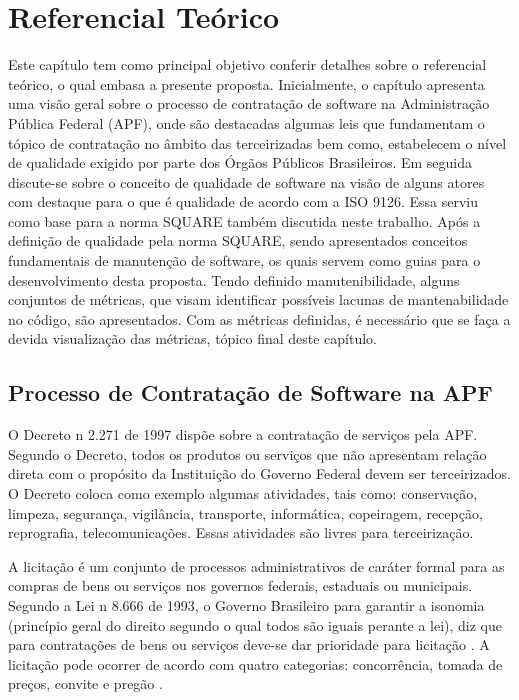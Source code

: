
\chapter[Referencial Teórico]{Referencial Teórico}	
Este capítulo tem como principal objetivo conferir detalhes sobre o referencial teórico, o qual embasa a presente proposta.    Inicialmente, o capítulo apresenta uma visão geral sobre o processo de contratação de software na Administração Pública Federal (APF), onde são destacadas algumas leis que fundamentam o tópico de contratação no âmbito das terceirizadas bem como, estabelecem o nível de qualidade exigido por parte dos Órgãos Públicos Brasileiros. Em seguida discute-se sobre o conceito de qualidade de software na visão de alguns atores com destaque para o que é qualidade de acordo com a ISO 9126. Essa serviu como base para a norma SQUARE também discutida neste trabalho. Após a definição de qualidade pela norma SQUARE, sendo apresentados conceitos fundamentais de manutenção de software, os quais servem como guias para o desenvolvimento desta proposta. Tendo definido manutenibilidade, alguns conjuntos de métricas, que visam identificar possíveis lacunas de mantenabilidade no código, são apresentados. Com as métricas definidas, é necessário que se faça a devida visualização das métricas, tópico final deste capítulo.
	
\section{Processo de Contratação de Software na APF}
O Decreto n 2.271 de 1997 \cite{decreto_2271} dispõe sobre a contratação de serviços pela APF. Segundo o Decreto, todos os produtos ou serviços que não apresentam relação direta com o propósito da Instituição do Governo Federal devem ser terceirizados. O Decreto coloca como exemplo algumas atividades, tais como: conservação, limpeza, segurança, vigilância, transporte, informática, copeiragem, recepção, reprografia, telecomunicações. Essas atividades são livres para terceirização.

A licitação é um conjunto de processos administrativos de caráter formal para as compras de bens ou serviços nos governos federais, estaduais ou municipais. Segundo a Lei  n 8.666 de 1993, o Governo Brasileiro para garantir a isonomia (princípio geral do direito segundo o qual todos são iguais perante a lei), diz que para contratações de bens ou serviços deve-se dar prioridade para licitação \cite{Lei_1993}. A licitação pode ocorrer de acordo com quatro categorias: concorrência, tomada de preços, convite e pregão \cite{brazil_licitacoes_2010}.

